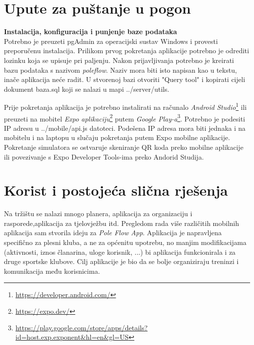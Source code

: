 \documentclass[times, utf8, zavrsni]{fer}
\begin{document}
			    
		

    \section{Upute za puštanje u pogon}
			 
			 
			 \textbf{Instalacija, konfiguracija i punjenje baze podataka}\\
			 \noindent Potrebno je preuzeti pgAdmin za operacijski sustav Windows i provesti preporučenu instalacija. Prilikom prvog pokretanja aplikacije potrebno je odrediti lozinku koja se upisuje pri paljenju. Nakon prijavljivanja potrebno je kreirati bazu podataka s nazivom \textit{poleflow}. Naziv mora biti isto napisan kao u tekstu, inače aplikacija neće radit. U stvorenoj bazi otvoriti "Query tool" i kopirati cijeli dokument baza.sql koji se nalazi u mapi ../server/utils.
			
			 Prije pokretanja aplikacija je potrebno instalirati na računalo \textit{Android Studio}\footnote{\url{https://developer.android.com/}} ili preuzeti na mobitel \textit{Expo aplikaciju}\footnote{\url{https://expo.dev/}} putem \textit{Google Play-a}\footnote{\url{https://play.google.com/store/apps/details?id=host.exp.exponent&hl=en&gl=US}}. Potrebno je podesiti IP adresu u ../mobile/api.js datoteci. Podešena IP adresa mora biti jednaka i na mobitelu i na laptopu u slučaju pokretanja putem Expo mobilne aplikacije. Pokretanje simulatora se ostvaruje skeniranje QR koda preko mobilne aplikacije ili povezivanje s Expo Developer Tools-ima preko Andorid Studija.
			
			
			\eject 
			
	\section{Korist i postojeća slična rješenja}
		Na tržištu se nalazi mnogo planera, aplikacija za organizaciju i rasporede,aplikacija za tjelovježbu itd. Pregledom rada više različitih mobilnih aplikacija sam stvorila ideju za \textit{Pole Flow App}. Aplikacija je napravljena specifično za plesni kluba, a ne za općenitu upotrebu, no manjim modifikacijama (aktivnosti, iznos članarina, uloge korisnik, ...) bi aplikacija funkcionirala i za druge sportske klubove. Cilj aplikacije je bio da se bolje organiziraju treninzi i komunikacija među korisnicima.
		
		\pagebreak
\end{document}
